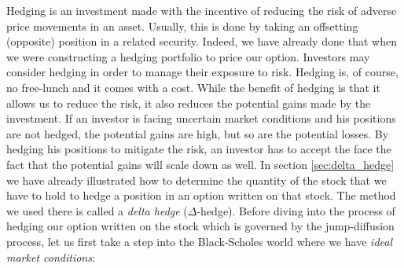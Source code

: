 \documentclass[times, utf8, diplomski]{fer}
\begin{document}
Hedging is an investment made with the incentive of reducing the risk of adverse price movements in an asset. Usually, this is done by taking an offsetting (opposite) position in a related security. Indeed, we have already done that when we were constructing a hedging portfolio to price our option. Investors may consider hedging in order to manage their exposure to risk. Hedging is, of course, no free-lunch and it comes with a cost. While the benefit of hedging is that it allows us to reduce the risk, it also reduces the potential gains made by the investment. If an investor is facing uncertain market conditions and his positions are not hedged, the potential gains are high, but so are the potential losses. By hedging his positions to mitigate the risk, an investor has to accept the face the fact that the potential gains will scale down as well. 
In section \ref{sec:delta_hedge} we have already illustrated how to determine the quantity of the stock that we have to hold to hedge a position in an option written on that stock. The method we used there is called a \textit{delta hedge} ($\Delta$-hedge). Before diving into the process of hedging our option written on the stock which is governed by the jump-diffusion process, let us first take a step into the Black-Scholes world where we have \textit{ideal market conditions}:
\end{document}
